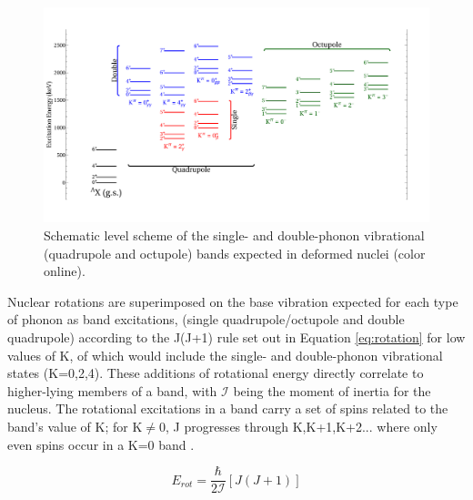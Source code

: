 \begin{figure}[h!] 
\begin{center}
\includegraphics[width=\textwidth]{phonon_deformed.pdf}
\caption{Schematic level scheme of the single- and double-phonon vibrational (quadrupole and octupole) bands expected in deformed nuclei (color online).}
\label{fig:phonon_def}
\end{center}
\end{figure}

Nuclear rotations are superimposed on the base vibration expected for each type of phonon as band excitations, (single quadrupole/octupole and double quadrupole) according to the J(J+1) rule set out in Equation \ref{eq:rotation} for low values of K, of which would include the single- and double-phonon vibrational states (K=0,2,4). These additions of rotational energy directly correlate to higher-lying members of a band, with $\mathcal{I}$ being the moment of inertia for the nucleus. The rotational excitations in a band carry a set of spins related to the band's value of K; for K$\neq$0, J progresses through K,K+1,K+2... where only even spins occur in a K=0 band \cite{Greiner_Maruhn_text}.

\begin{equation}\label{eq:rotation}
E_{rot}=\frac{\hbar}{2\mathcal{I}}[J(J+1)] %
\end{equation}

